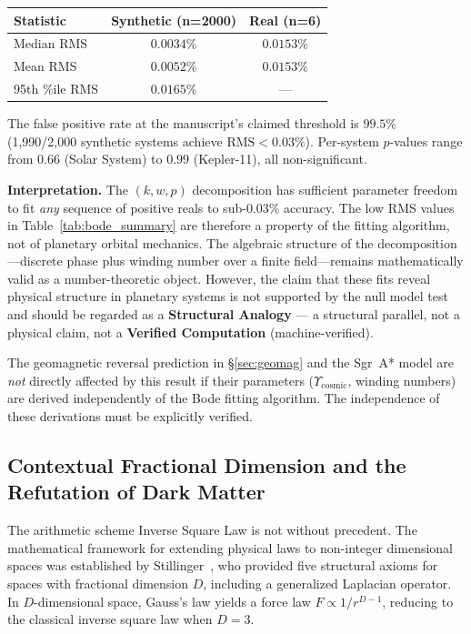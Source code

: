 \begin{center}
\begin{tabular}{lcc}
\toprule
\textbf{Statistic} & \textbf{Synthetic (n=2000)} & \textbf{Real (n=6)} \\
\midrule
Median RMS & $0.0034\%$ & $0.0153\%$ \\
Mean RMS & $0.0052\%$ & $0.0153\%$ \\
95th \%ile RMS & $0.0165\%$ & --- \\
\bottomrule
\end{tabular}
\end{center}

The false positive rate at the manuscript's claimed threshold is $99.5\%$ (1,990/2,000 synthetic systems achieve $\mathrm{RMS} < 0.03\%$). Per-system $p$-values range from $0.66$ (Solar System) to $0.99$ (Kepler-11), all non-significant.

\textbf{Interpretation.} The $(k, w, p)$ decomposition has sufficient parameter freedom to fit \emph{any} sequence of positive reals to sub-$0.03\%$ accuracy. The low RMS values in Table~\ref{tab:bode_summary} are therefore a property of the fitting algorithm, not of planetary orbital mechanics. The algebraic structure of the decomposition---discrete phase plus winding number over a finite field---remains mathematically valid as a number-theoretic object. However, the claim that these fits reveal physical structure in planetary systems is not supported by the null model test and should be regarded as a \textbf{Structural Analogy} --- a structural parallel, not a physical claim, not a \textbf{Verified Computation} (machine-verified).

The geomagnetic reversal prediction in \S\ref{sec:geomag} and the Sgr~A* model are \emph{not} directly affected by this result if their parameters ($\Upsilon_{\mathrm{cosmic}}$, winding numbers) are derived independently of the Bode fitting algorithm. The independence of these derivations must be explicitly verified.

\subsection{Contextual Fractional Dimension and the Refutation of Dark Matter}
The arithmetic scheme Inverse Square Law is not without precedent. The mathematical framework for extending physical laws to non-integer dimensional spaces was established by Stillinger~\cite{stillinger1977}, who provided five structural axioms for spaces with fractional dimension $D$, including a generalized Laplacian operator. In $D$-dimensional space, Gauss's law yields a force law $F \propto 1/r^{D-1}$, reducing to the classical inverse square law when $D = 3$.


